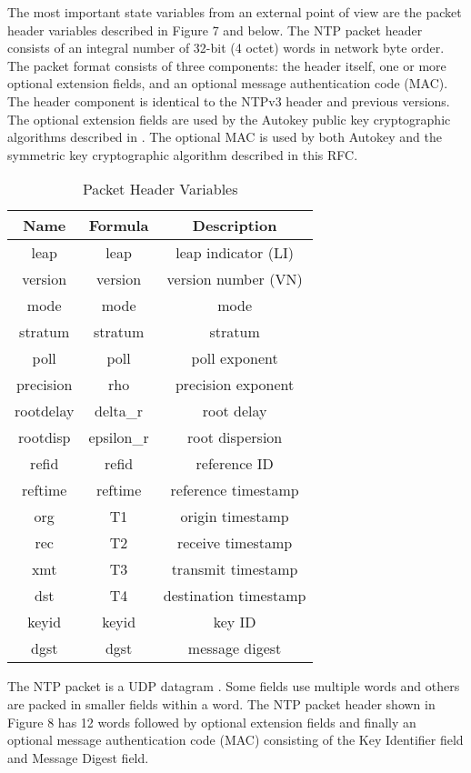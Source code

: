 The most important state variables from an external point of view are
the packet header variables described in Figure 7 and below. The NTP
packet header consists of an integral number of 32-bit (4 octet)
words in network byte order. The packet format consists of three
components: the header itself, one or more optional extension fields,
and an optional message authentication code (MAC). The header
component is identical to the NTPv3 header and previous versions.
The optional extension fields are used by the Autokey public key
cryptographic algorithms described in \cite{RFC5906}. The optional MAC is
used by both Autokey and the symmetric key cryptographic algorithm
described in this RFC.

\begin{table}[htb]
\center
\begin{tabular}{c | c | c}
Name & Formula & Description \\
\hline
\hline
leap & leap & leap indicator (LI) \\
version & version & version number (VN) \\
mode & mode & mode \\
stratum & stratum & stratum \\
poll & poll & poll exponent \\
precision & rho & precision exponent \\
rootdelay & delta\_r & root delay \\
rootdisp & epsilon\_r & root dispersion \\
refid & refid & reference ID \\
reftime & reftime & reference timestamp \\
org & T1 & origin timestamp \\
rec & T2 & receive timestamp \\
xmt & T3 & transmit timestamp \\
dst & T4 & destination timestamp \\
keyid & keyid & key ID \\
dgst & dgst & message digest \\
\hline
\end{tabular}
\label{packet_header_variables}
\caption{Packet Header Variables}
\end{table}

The NTP packet is a UDP datagram \cite{RFC0768}. Some fields use multiple
words and others are packed in smaller fields within a word. The NTP
packet header shown in Figure 8 has 12 words followed by optional
extension fields and finally an optional message authentication code
(MAC) consisting of the Key Identifier field and Message Digest
field.

